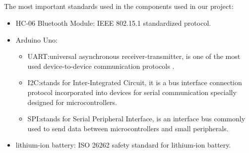 \documentclass[12pt,a4paper]{report}
\begin{document}
\subsection{\fontsize{12}{12}\selectfont{Standards:}}
The most important standards used in the components used in our project:
\begin{itemize}
  \item HC-06 Bluetooth Module: IEEE 802.15.1 standardized protocol.  
  \item Arduino Uno:
  \begin{itemize}
  \item UART:universal asynchronous receiver-transmitter, is one of the most used
   device-to-device communication protocols . 
  \item I2C:stands for Inter-Integrated Circuit, it is a bus interface connection
   protocol incorporated into devices for serial communication specially designed
    for microcontrollers.
  \item SPI:stands for Serial Peripheral Interface, is an interface bus commonly
   used to send data between microcontrollers and small peripherals. 
\end{itemize}
  
  \item lithium-ion battery: ISO 26262 safety standard for lithium-ion battery. 
\end{itemize}
\end{document}
